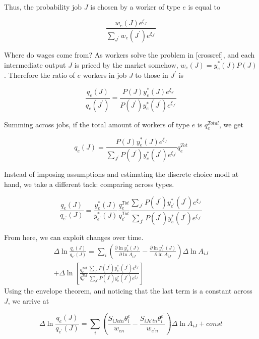 \documentclass[12pt]{article}
\begin{document}
Thus, the probability job $J$ is chosen by a worker of type $e$ is equal to

\begin{equation}
\frac{w_e(J)e^{\xi_J}}{\sum_{J^\prime}w_e(J^\prime)e^{\xi_{J^\prime}}}
\end{equation}

Where do wages come from? As workers solve the problem in [crossref], and each intermediate output $J$ is priced by the market somehow,
$w_e(J)=y_e^*(J)P(J)$. Therefore the ratio of $e$ workers in job $J$ to those in $J^\prime$ is

\begin{equation}
\frac{q_e(J)}{q_e(J^\prime)}=\frac{P(J)y^*_e(J) e^{\xi_{J}}}{P(J^\prime)y^*_e(J^\prime)e^{\xi_{J^\prime}}}
\end{equation}

Summing across jobs, if the total amount of workers of type $e$ is $q_e^{Total}$, we get

\begin{equation}
q_e(J)=\frac{P(J)y^*_e(J) e^{\xi_{J}}}{\sum_{J^\prime}P(J^\prime)y^*_e(J^\prime)e^{\xi_{J^\prime}}}q_e^{Tot}
\end{equation}


Instead of imposing assumptions and estimating the discrete choice modl at hand, we take a different tack: comparing across types.

\begin{equation}
\frac{q_e(J)}{q_{e^\prime}(J)}=\frac{y^*_e(J)}{y^*_{e^\prime}(J)}\frac{q_e^{Tot}}{q_{e^\prime}^{Tot}}\frac{\sum_{J^\prime}P(J^\prime)y^*_{e^\prime}(J^\prime)e^{\xi_{J^\prime}}}{\sum_{J^\prime}P(J^\prime)y^*_{e}(J^\prime)e^{\xi_{J^\prime}}}
\end{equation}

From here, we can exploit changes over time.
\begin{eqnarray}
\Delta \ln \frac{q_e(J)}{q_{e^\prime}(J)}=\sum_i\left (\frac{\partial \ln y^*_e(J)}{\partial \ln A_{iJ}}-\frac{\partial \ln y^*_{e^\prime}(J)}{\partial \ln A_{iJ}}\right)\Delta \ln A_{iJ}\\
+\Delta \ln \left [\frac{q_e^{Tot}}{q_{e^\prime}^{Tot}}\frac{\sum_{J^\prime}P(J^\prime)y^*_{e^\prime}(J^\prime)e^{\xi_{J^\prime}}}{\sum_{J^\prime}P(J^\prime)y^*_{e}(J^\prime)e^{\xi_{J^\prime}}}\right] 
\end{eqnarray}
Using the envelope theorem, and noticing that the last term is a constant across $J$, we arrive at

\begin{equation}
\Delta \ln \frac{q_e(J)}{q_{e^\prime}(J)}=\sum_i\left (\frac{S_{iJetn}\theta_i^e}{w_{en}}-\frac{S_{iJe^\prime tn}\theta_i^{e^\prime}}{w_{e^\prime n}}\right)\Delta \ln A_{iJ}+const
\end{equation}
\end{document}
